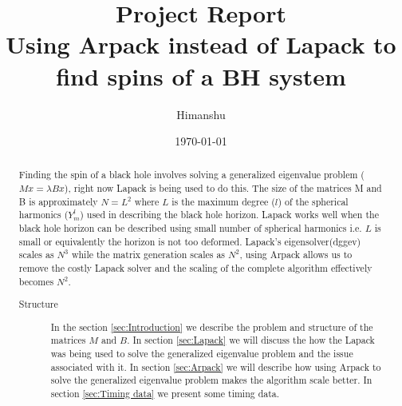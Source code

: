 \documentclass[%
 reprint,
 amsmath,amssymb,
 aps,
]{revtex4-2}
\begin{document}

\title{Project Report\\
  Using Arpack instead of Lapack to find spins of a BH system}%

\author{Himanshu}



\date{\today}%

\begin{abstract}
  Finding the spin of a black hole involves solving a generalized eigenvalue problem ($M x = \lambda B x$), right now Lapack is being used to do this.  The size of the matrices M and B is approximately $N = L^2$ where $L$ is the maximum degree ($l$) of the spherical harmonics ($Y^l_m$) used in describing the black hole horizon.
  Lapack works well when the black hole horizon can be described using small number of spherical harmonics i.e. $L$ is small or equivalently the horizon is not too deformed. Lapack's eigensolver(dggev) scales as $N^3$ while the matrix  generation scales as $N^2$, using Arpack allows us to remove the costly Lapack solver and the scaling of the complete algorithm effectively becomes $N^2$.

\begin{description}

\item[Structure] 
  In the section \ref{sec:Introduction} we describe the problem and structure of the matrices $M$ and $B$. In section \ref{sec:Lapack} we will discuss the how the Lapack was being used to solve the generalized eigenvalue problem and the issue associated with it. In section \ref{sec:Arpack} we will describe how using Arpack to solve the generalized eigenvalue problem makes the algorithm scale better. In section \ref{sec:Timing data} we present some timing data.
\end{description}
\end{abstract}

\maketitle
\end{document}
